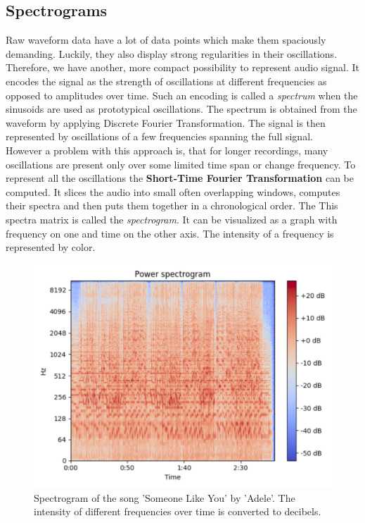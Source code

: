 \subsection{Spectrograms}
Raw waveform data have a lot of data points which make them spaciously demanding. Luckily, they also display strong regularities in their oscillations. Therefore, we have another, more compact possibility to represent audio signal. It encodes the signal as the strength of oscillations at different frequencies as opposed to amplitudes over time. Such an encoding is called a \textit{spectrum} when the sinusoids are used as prototypical oscillations.
The spectrum is obtained from the waveform by applying Discrete Fourier Transformation. The signal is then represented by oscillations of a few frequencies spanning the full signal. \\
However a problem with this approach is, that for longer recordings, many oscillations are present only over some limited time span or change frequency. To represent all the oscillations the \textbf{Short-Time Fourier Transformation} can be computed. It slices the audio into small often overlapping windows, computes their spectra and then puts them together in a chronological order. The This spectra matrix is called the \textit{spectrogram}. It can be visualized as a graph with frequency on one and time on the other axis. The intensity of a frequency is represented by color.

\begin{figure}[h]
    \centering
	\includegraphics[width=140mm]{./img/ilustrative_spectrogram.png}
	\caption{Spectrogram of the song 'Someone Like You' by 'Adele'. The intensity of different frequencies over time is converted to decibels.}
	\label{fig:ilustrative_specrogram}
\end{figure}

